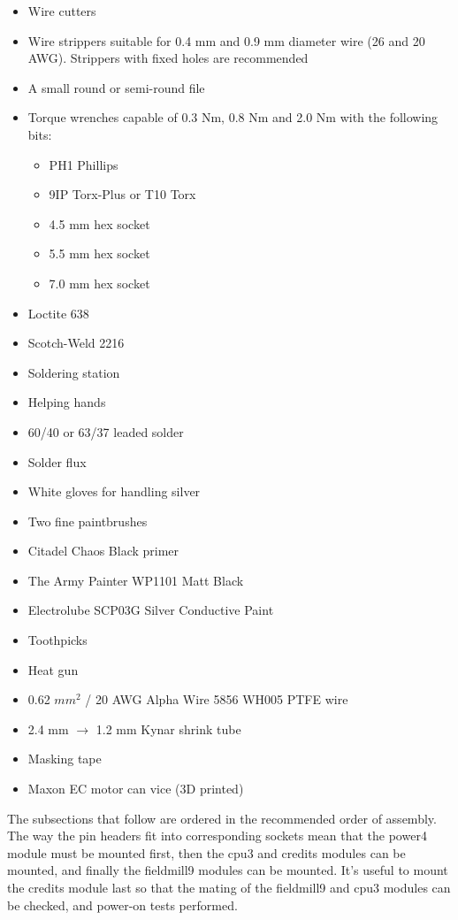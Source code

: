 \documentclass{article}
\begin{document}
\begin{itemize}
\item Wire cutters
\item Wire strippers suitable for 0.4 mm and 0.9 mm diameter wire (26 and 20 AWG). Strippers with fixed holes are recommended
\item A small round or semi-round file
\item Torque wrenches capable of 0.3 Nm, 0.8 Nm and 2.0 Nm with the following bits:
\begin{itemize}
\item PH1 Phillips
\item 9IP Torx-Plus or T10 Torx
\item 4.5 mm hex socket
\item 5.5 mm hex socket
\item 7.0 mm hex socket
\end{itemize}
\item Loctite 638
\item Scotch-Weld 2216
\item Soldering station
\item Helping hands
\item 60/40 or 63/37 leaded solder
\item Solder flux
\item White gloves for handling silver
\item Two fine paintbrushes
\item Citadel Chaos Black primer
\item The Army Painter WP1101 Matt Black
\item Electrolube SCP03G Silver Conductive Paint
\item Toothpicks
\item Heat gun
\item 0.62 $mm^2$ / 20 AWG Alpha Wire 5856 WH005 PTFE wire
\item 2.4 mm $\rightarrow$ 1.2 mm Kynar shrink tube
\item Masking tape
\item Maxon EC motor can vice (3D printed)
\end{itemize}

The subsections that follow are ordered in the recommended order of assembly.
The way the pin headers fit into corresponding sockets mean that the power4 module must be mounted first,
then the cpu3 and credits modules can be mounted, and finally the fieldmill9 modules can be mounted.
It's useful to mount the credits module last so that the mating of the fieldmill9 and cpu3 modules can be checked,
and power-on tests performed.
\end{document}
